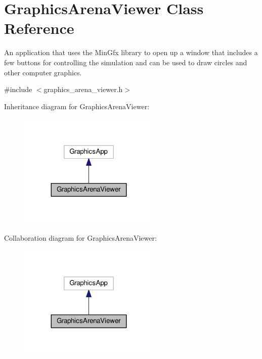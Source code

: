 \hypertarget{classGraphicsArenaViewer}{}\section{Graphics\+Arena\+Viewer Class Reference}
\label{classGraphicsArenaViewer}


An application that uses the Min\+Gfx library to open up a window that includes a few buttons for controlling the simulation and can be used to draw circles and other computer graphics.  




{\ttfamily \#include $<$graphics\+\_\+arena\+\_\+viewer.\+h$>$}



Inheritance diagram for Graphics\+Arena\+Viewer\+:\nopagebreak
\begin{figure}[H]
\begin{center}
\leavevmode
\includegraphics[width=191pt]{classGraphicsArenaViewer__inherit__graph}
\end{center}
\end{figure}


Collaboration diagram for Graphics\+Arena\+Viewer\+:\nopagebreak
\begin{figure}[H]
\begin{center}
\leavevmode
\includegraphics[width=191pt]{classGraphicsArenaViewer__coll__graph}
\end{center}
\end{figure}
